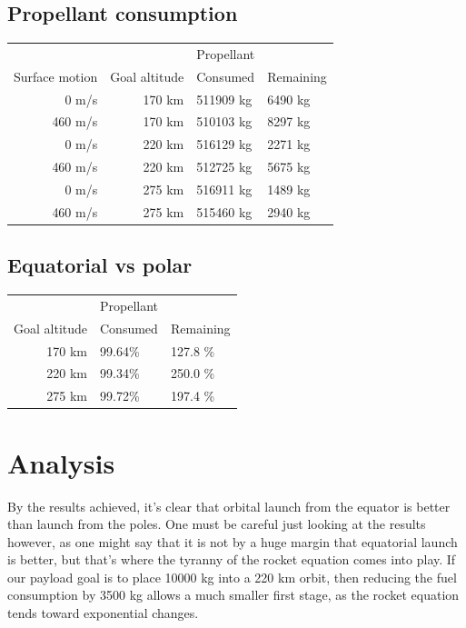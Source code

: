 \documentclass[11pt]{article}
\begin{document}
\subsection{Propellant consumption}
\begin{center}
  \begin{tabular}{ r | r  | l  l  }
     &   &   Propellant   \\
    Surface motion &  Goal altitude & Consumed & Remaining \\
    \hline
    0 m/s & 170 km & 511909 kg & 6490 kg \\
    460 m/s & 170 km & 510103 kg & 8297 kg \\
    \hline
    0 m/s & 220 km & 516129 kg & 2271 kg \\
    460 m/s & 220 km  & 512725 kg & 5675 kg \\
    \hline
    0 m/s & 275 km & 516911 kg & 1489 kg \\
    460 m/s & 275 km & 515460 kg & 2940 kg
  \end{tabular}
\end{center}

\subsection{Equatorial vs polar}
\begin{center}
  \begin{tabular}{ r | l  l  }
     &   Propellant   \\
    Goal altitude & Consumed & Remaining \\
    \hline
    170 km & 99.64\% & 127.8 \% \\
    220 km & 99.34\% & 250.0 \% \\
    275 km & 99.72\% & 197.4 \%
  \end{tabular}
\end{center}


\section{Analysis}

By the results achieved, it's clear that orbital launch from the equator is better than launch from the poles. 
One must be careful just looking at the results however, as one might say that it is not by a huge margin that equatorial launch is better, but that's where the tyranny of the rocket equation comes into play.
If our payload goal is to place 10000 kg into a 220 km orbit, then reducing the fuel consumption by 3500 kg allows a much smaller first stage, as the rocket equation tends toward exponential changes.
\end{document}
